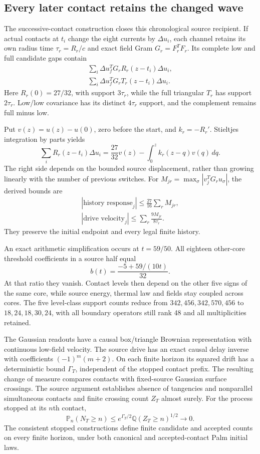 \subsection{Every later contact retains the changed wave}

The successive-contact construction closes this chronological source
recipient. If actual contacts at \(t_i\) change the eight currents by
\(\Delta u_i\), each channel retains its own radius time
\(\tau_r=R_r/c\) and exact field Gram \(G_r=F_r^TF_r\).
Its complete low and full candidate gaps contain
\[
\begin{gathered}
\sum_i\Delta u_f^TG_rR_r(z-t_i)\Delta u_i,\\
 \sum_i\Delta u_f^TG_rT_r(z-t_i)\Delta u_i.
\end{gathered}
\]
Here \(R_r(0)=27/32\), with support \(3\tau_r\), while the full triangular
\(T_r\) has support \(2\tau_r\). Low/low covariance has its distinct
\(4\tau_r\) support, and the complement remains full minus low.

Put \(v(z)=u(z)-u(0)\), zero before the start, and \(k_r=-R_r'\).
Stieltjes integration by parts yields
\[
 \sum_iR_r(z-t_i)\Delta u_i
   =\frac{27}{32}v(z)-\int_0^zk_r(z-q)v(q)\,dq.
\]
The right side depends on the bounded source displacement, rather than
growing linearly with the number of previous switches. For
\(M_{jr}=\max_\sigma|v_j^TG_ru_\sigma|\), the derived bounds are
\[
\begin{gathered}
|\text{history response}_j|\leq\frac{27}{16}\sum_rM_{jr},
 \\
 |\text{drive velocity}_j|\leq\sum_r\frac{9M_{jr}}{8\tau_r}.
\end{gathered}
\]
They preserve the initial endpoint and every legal finite history.

An exact arithmetic simplification occurs at \(t=59/50\). All eighteen
other-core threshold coefficients in a source half equal
\[
 b(t)=\frac{-5+59/(10t)}{32}.
\]
At that ratio they vanish. Contact levels then depend on the other five
signs of the same core, while source energy, thermal law and fields stay
coupled across cores. The five level-class support counts reduce from
\(342,456,342,570,456\) to \(18,24,18,30,24\), with all boundary
operators still rank 48 and all multiplicities retained.

The Gaussian readouts have a causal box/triangle Brownian representation
with continuous low-field velocity. The source drive has an exact causal
delay inverse with coefficients \((-1)^m(m+2)\). On each finite horizon
its squared drift has a deterministic bound \(\Gamma_T\), independent
of the stopped contact prefix. The resulting change of measure compares
contacts with fixed-source Gaussian surface crossings. The source
argument establishes absence of tangencies and nonparallel simultaneous
contacts and finite crossing count \(Z_T\) almost surely. For the process
stopped at its \(n\)th contact,
\[
 {\mathbb P}_n(N_T\geq n)
 \leq e^{\Gamma_T/2}{\mathbb Q}(Z_T\geq n)^{1/2}
 \longrightarrow0.
\]
The consistent stopped constructions define finite candidate and accepted
counts on every finite horizon, under both canonical and accepted-contact
Palm initial laws.

